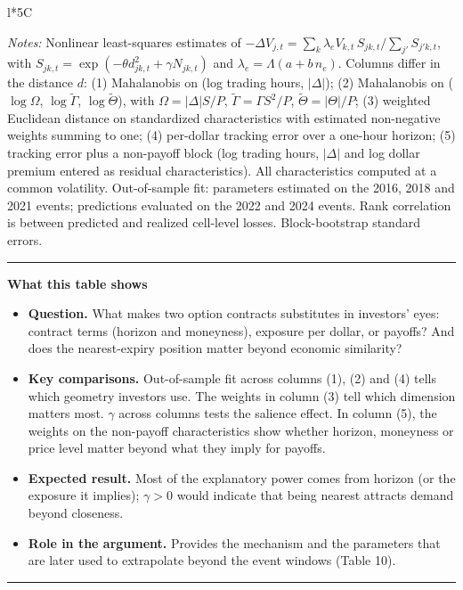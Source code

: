 \documentclass[11pt]{article}
\newenvironment{tableshows}
  {\begin{center}\begin{minipage}{0.95\textwidth}\small
   \hrule\vspace{4pt}
   \textbf{What this table shows}\par
   \begin{itemize}[leftmargin=12pt,topsep=4pt,itemsep=4pt,parsep=0pt]}
  {\end{itemize}\vspace{2pt}\hrule\end{minipage}\end{center}}
\begin{document}
\begin{table}[H]
\begin{threeparttable}
\begin{tabularx}{\textwidth}{l*{5}{C}}
\bottomrule
\end{tabularx}
\begin{tablenotes}
\footnotesize
\item[] \textit{Notes:} Nonlinear least-squares estimates of $-\Delta V_{j,t} = \sum_k \lambda_e V_{k,t}\, S_{jk,t} / \sum_{j'} S_{j'k,t}$, with $S_{jk,t} = \exp(-\theta d^2_{jk,t} + \gamma N_{jk,t})$ and $\lambda_e = \Lambda(a + b\,n_e)$. Columns differ in the distance $d$: (1) Mahalanobis on (log trading hours, $|\Delta|$); (2) Mahalanobis on ($\log\Omega$, $\log\tilde\Gamma$, $\log\tilde\Theta$), with $\Omega = |\Delta|S/P$, $\tilde\Gamma = \Gamma S^2/P$, $\tilde\Theta = |\Theta|/P$; (3) weighted Euclidean distance on standardized characteristics with estimated non-negative weights summing to one; (4) per-dollar tracking error over a one-hour horizon; (5) tracking error plus a non-payoff block (log trading hours, $|\Delta|$ and log dollar premium entered as residual characteristics). All characteristics computed at a common volatility. Out-of-sample fit: parameters estimated on the 2016, 2018 and 2021 events; predictions evaluated on the 2022 and 2024 events. Rank correlation is between predicted and realized cell-level losses. Block-bootstrap standard errors.
\end{tablenotes}
\end{threeparttable}
\end{table}

\begin{tableshows}
\item \textbf{Question.} What makes two option contracts substitutes in investors' eyes: contract terms (horizon and moneyness), exposure per dollar, or payoffs? And does the nearest-expiry position matter beyond economic similarity?
\item \textbf{Key comparisons.} Out-of-sample fit across columns (1), (2) and (4) tells which geometry investors use. The weights in column (3) tell which dimension matters most. $\gamma$ across columns tests the salience effect. In column (5), the weights on the non-payoff characteristics show whether horizon, moneyness or price level matter beyond what they imply for payoffs.
\item \textbf{Expected result.} Most of the explanatory power comes from horizon (or the exposure it implies); $\gamma > 0$ would indicate that being nearest attracts demand beyond closeness.
\item \textbf{Role in the argument.} Provides the mechanism and the parameters that are later used to extrapolate beyond the event windows (Table 10).
\end{tableshows}
\end{document}
